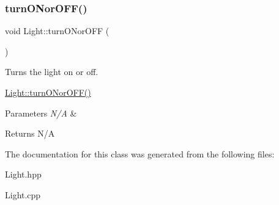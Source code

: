 \subsubsection{\texorpdfstring{turn\+O\+Nor\+O\+F\+F()}{turnONorOFF()}}
{\footnotesize\ttfamily void Light\+::turn\+O\+Nor\+O\+FF (\begin{DoxyParamCaption}{ }\end{DoxyParamCaption})}



Turns the light on or off. 

\hyperlink{class_light_ab22e6d81d0ccb2f844d404e2e038f9a2}{Light\+::turn\+O\+Nor\+O\+F\+F()} 
\begin{DoxyParams}{Parameters}
{\em N/A} & \\
\hline
\end{DoxyParams}
\begin{DoxyReturn}{Returns}
N/A 
\end{DoxyReturn}


The documentation for this class was generated from the following files\+:\begin{DoxyCompactItemize}
\item 
Light.\+hpp\item 
Light.\+cpp\end{DoxyCompactItemize}
